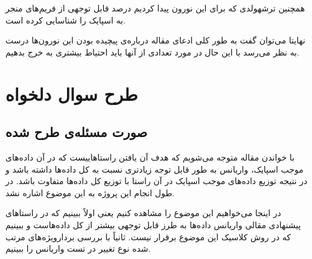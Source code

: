 \documentclass[12pt,onecolumn,a4paper,fleqn]{article}
\begin{document}
 \begin{figure}[ht]
	\centering
	\hfill
\end{figure}

همچنین ترشهولدی که برای این نورون‌ پیدا کردیم درصد قابل توجهی از فریم‌های منجر به اسپایک را شناسایی کرده است.

نهایتا می‌توان گفت به طور کلی ادعای مقاله درباره‌ی پیچیده بودن این نورون‌ها درست به نظر می‌رسد با این حال در مورد تعدادی از آنها باید احتیاط بیشتری به خرج بدهیم.

\pagebreak

\section{طرح سوال‌ دلخواه}
\subsection{صورت مسئله‌ی طرح شده}
با خواندن مقاله متوجه می‌شویم که هدف آن یافتن راستا‌هاییست که در آن داده‌های موجب اسپایک، واریانس به طور قابل‌ توجه زیادتری نسبت به کل داده‌ها داشته باشد و در نتیجه توزیع داده‌های موجب اسپایک در آن راستا با توزیع کل داده‌ها متفاوت باشد. در طول انجام این پروژه به این موضوع اشاره نشد. 

در اینجا می‌خواهیم این موضوع را مشاهده کنیم یعنی اولاً ببینیم که در راستاهای پیشنهادی مقالی واریانس داده‌ها به طرز قابل توجهی بیشتر از کل داده‌هاست و ببینیم که در روش کلاسیک  این موضوع برقرار نیست. ثانیاً با بررسی بردارویژه‌های مرتب شده نوع تغییر  در تست واریانس را ببینیم.
\end{document}
